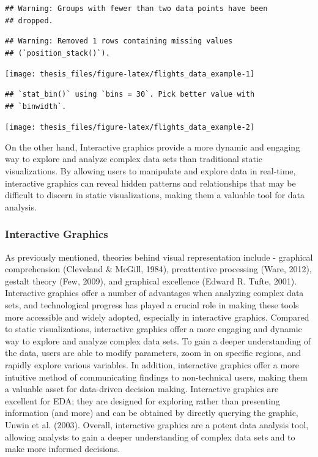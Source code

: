 \documentclass[print]{nuthesis}
\begin{document}
\begin{verbatim}
## Warning: Groups with fewer than two data points have been
## dropped.
\end{verbatim}

\begin{verbatim}
## Warning: Removed 1 rows containing missing values
## (`position_stack()`).
\end{verbatim}

\begin{center}\texttt{[image: thesis\_files/figure-latex/flights\_data\_example-1]} \end{center}

\begin{verbatim}
## `stat_bin()` using `bins = 30`. Pick better value with
## `binwidth`.
\end{verbatim}

\begin{center}\texttt{[image: thesis\_files/figure-latex/flights\_data\_example-2]} \end{center}

On the other hand, Interactive graphics provide a more dynamic and engaging way to explore and analyze complex data sets than traditional static visualizations.
By allowing users to manipulate and explore data in real-time, interactive graphics can reveal hidden patterns and relationships that may be difficult to discern in static visualizations, making them a valuable tool for data analysis.

\hypertarget{interactive-graphics}{%
\subsubsection{Interactive Graphics}\label{interactive-graphics}}

As previously mentioned, theories behind visual representation include - graphical comprehension (Cleveland \& McGill, 1984), preattentive processing (Ware, 2012), gestalt theory (Few, 2009), and graphical excellence (Edward R. Tufte, 2001).
Interactive graphics offer a number of advantages when analyzing complex data sets, and technological progress has played a crucial role in making these tools more accessible and widely adopted, especially in interactive graphics.
Compared to static visualizations, interactive graphics offer a more engaging and dynamic way to explore and analyze complex data sets.
To gain a deeper understanding of the data, users are able to modify parameters, zoom in on specific regions, and rapidly explore various variables.
In addition, interactive graphics offer a more intuitive method of communicating findings to non-technical users, making them a valuable asset for data-driven decision making.
Interactive graphics are excellent for EDA; they are designed for exploring rather than presenting information (and more) and can be obtained by directly querying the graphic, Unwin et al. (2003).
Overall, interactive graphics are a potent data analysis tool, allowing analysts to gain a deeper understanding of complex data sets and to make more informed decisions.
\end{document}
